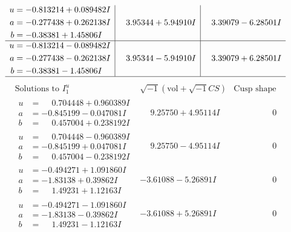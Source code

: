 \documentclass[1p]{elsarticle_modified}
\theoremstyle{definition}
\newcommand{\I}{\sqrt{-1}}
\begin{document}
$$\begin{array}{c|c|c}
\begin{aligned}
u &= -0.813214 + 0.089482 I \\
a &= -0.277438 + 0.262138 I \\
b &= -0.38381 + 1.45806 I\end{aligned}
 & \phantom{-}3.95344 + 5.94910 I & \phantom{-}3.39079 - 6.28501 I \\ \hline\begin{aligned}
u &= -0.813214 - 0.089482 I \\
a &= -0.277438 - 0.262138 I \\
b &= -0.38381 - 1.45806 I\end{aligned}
 & \phantom{-}3.95344 - 5.94910 I & \phantom{-}3.39079 + 6.28501 I\\
 \hline 
 \end{array}$$\newpage$$\begin{array}{c|c|c}  
\text{Solutions to }I^u_{1}& \I (\text{vol} + \sqrt{-1}CS) & \text{Cusp shape}\\
 \hline 
\begin{aligned}
u &= \phantom{-}0.704448 + 0.960389 I \\
a &= -0.845199 - 0.047081 I \\
b &= \phantom{-}0.457004 + 0.238192 I\end{aligned}
 & \phantom{-}9.25750 + 4.95114 I & \phantom{-0.000000 } 0 \\ \hline\begin{aligned}
u &= \phantom{-}0.704448 - 0.960389 I \\
a &= -0.845199 + 0.047081 I \\
b &= \phantom{-}0.457004 - 0.238192 I\end{aligned}
 & \phantom{-}9.25750 - 4.95114 I & \phantom{-0.000000 } 0 \\ \hline\begin{aligned}
u &= -0.494271 + 1.091860 I \\
a &= -1.83138 + 0.39862 I \\
b &= \phantom{-}1.49231 + 1.12163 I\end{aligned}
 & -3.61088 - 5.26891 I & \phantom{-0.000000 } 0 \\ \hline\begin{aligned}
u &= -0.494271 - 1.091860 I \\
a &= -1.83138 - 0.39862 I \\
b &= \phantom{-}1.49231 - 1.12163 I\end{aligned}
 & -3.61088 + 5.26891 I & \phantom{-0.000000 } 0 \\ \hline\begin{aligned}

\end{aligned}
\end{array}$$
\end{document}
